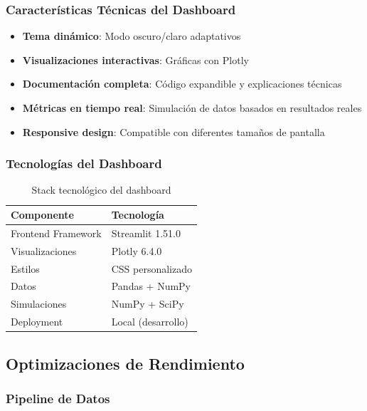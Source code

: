 \documentclass[12pt,a4paper]{article}
\begin{document}
\subsubsection{Características Técnicas del Dashboard}

\begin{itemize}
    \item \textbf{Tema dinámico}: Modo oscuro/claro adaptativos
    \item \textbf{Visualizaciones interactivas}: Gráficas con Plotly
    \item \textbf{Documentación completa}: Código expandible y explicaciones técnicas
    \item \textbf{Métricas en tiempo real}: Simulación de datos basados en resultados reales
    \item \textbf{Responsive design}: Compatible con diferentes tamaños de pantalla
\end{itemize}

\subsubsection{Tecnologías del Dashboard}

\begin{table}[H]
\centering
\caption{Stack tecnológico del dashboard}
\begin{tabular}{@{}ll@{}}
\toprule
\textbf{Componente} & \textbf{Tecnología} \\
\midrule
Frontend Framework & Streamlit 1.51.0 \\
Visualizaciones & Plotly 6.4.0 \\
Estilos & CSS personalizado \\
Datos & Pandas + NumPy \\
Simulaciones & NumPy + SciPy \\
Deployment & Local (desarrollo) \\
\bottomrule
\end{tabular}
\end{table}

\subsection{Optimizaciones de Rendimiento}

\subsubsection{Pipeline de Datos}
\end{document}
